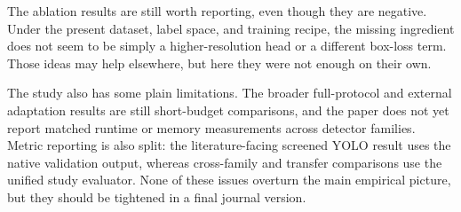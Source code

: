 The ablation results are still worth reporting, even though they are negative. Under the present dataset, label space, and training recipe, the missing ingredient does not seem to be simply a higher-resolution head or a different box-loss term. Those ideas may help elsewhere, but here they were not enough on their own.

The study also has some plain limitations. The broader full-protocol and external adaptation results are still short-budget comparisons, and the paper does not yet report matched runtime or memory measurements across detector families. Metric reporting is also split: the literature-facing screened YOLO result uses the native validation output, whereas cross-family and transfer comparisons use the unified study evaluator. None of these issues overturn the main empirical picture, but they should be tightened in a final journal version.
